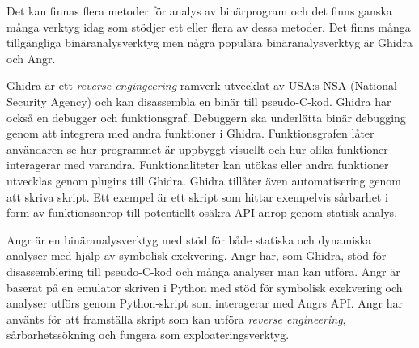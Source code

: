 Det kan finnas flera metoder för analys av binärprogram och det finns ganska
många verktyg idag som stödjer ett eller flera av dessa metoder. Det finns
många tillgängliga binäranalysverktyg men några populära binäranalysverktyg är
Ghidra\cite{ghidra_website} och Angr\cite{angr_web}.



Ghidra är ett \emph{reverse engingeering} ramverk utvecklat av USA:s NSA
(National Security Agency) och kan disassembla en binär till pseudo-C-kod.
Ghidra har också en debugger och funktionsgraf. Debuggern ska underlätta binär
debugging genom att integrera med andra funktioner i Ghidra. Funktionsgrafen
låter användaren se hur programmet är uppbyggt visuellt och hur olika
funktioner interagerar med varandra. Funktionaliteter kan utökas eller andra
funktioner utvecklas genom plugins till Ghidra\cite{ghidra_use_cases}. Ghidra
tillåter även automatisering genom att skriva skript. Ett exempel är ett skript
som hittar exempelvis sårbarhet i form av funktionsanrop till potentiellt
osäkra API-anrop genom statisk analys\cite{ghidra_script}.

Angr är en binäranalysverktyg med stöd för både statiska och dynamiska analyser
med hjälp av symbolisk exekvering. Angr har, som Ghidra, stöd för
disassemblering till pseudo-C-kod och många analyser man kan utföra. Angr är
baserat på en emulator skriven i Python med stöd för symbolisk exekvering och
analyser utförs genom Python-skript som interagerar med Angrs API. Angr har
använts för att framställa skript som kan utföra \emph{reverse engineering},
sårbarhetssökning och fungera som exploateringsverktyg\cite{angr_docs}.
